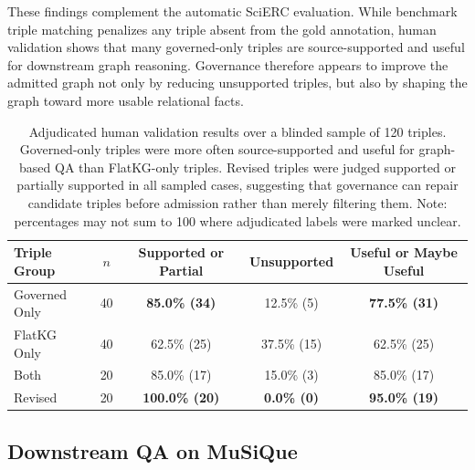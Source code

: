 \documentclass{article}
\begin{document}
These findings complement the automatic SciERC evaluation. While benchmark triple matching penalizes any triple absent from the gold annotation, human validation shows that many governed-only triples are source-supported and useful for downstream graph reasoning. Governance therefore appears to improve the admitted graph not only by reducing unsupported triples, but also by shaping the graph toward more usable relational facts.

\begin{table}[h]
\centering
\small
\caption{
Adjudicated human validation results over a blinded sample of 120 triples.
Governed-only triples were more often source-supported and useful for graph-based QA than FlatKG-only triples. 
Revised triples were judged supported or partially supported in all sampled cases, suggesting that governance can repair candidate triples before admission rather than merely filtering them. Note: percentages may not sum to 100 where adjudicated labels were marked unclear.
}
\begin{tabular}{lcccc}
\toprule
\textbf{Triple Group} 
& \textbf{$n$} 
& \textbf{Supported or Partial} 
& \textbf{Unsupported} 
& \textbf{Useful or Maybe Useful} \\
\midrule
Governed Only 
& 40 
& \textbf{85.0\% (34)} 
& 12.5\% (5) 
& \textbf{77.5\% (31)} \\

FlatKG Only 
& 40 
& 62.5\% (25) 
& 37.5\% (15) 
& 62.5\% (25) \\

Both 
& 20 
& 85.0\% (17) 
& 15.0\% (3) 
& 85.0\% (17) \\

Revised 
& 20 
& \textbf{100.0\% (20)} 
& \textbf{0.0\% (0)} 
& \textbf{95.0\% (19)} \\
\bottomrule
\end{tabular}

\label{tab:human_validation_by_group}
\end{table}


\subsection{Downstream QA on MuSiQue}
\end{document}
